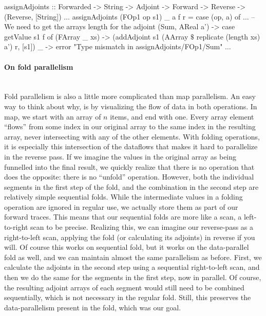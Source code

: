                 \begin{haskell}[caption=Implementation of the sum operator in \texttt{assignAdjoints}, label=lst:assign_sum, gobble=20]
                    assignAdjoints :: Forwarded -> String -> Adjoint -> Forward -> Reverse
                        -> (Reverse, [String])
                    $\dots$
                    assignAdjoints (FOp1 op s1) _ a f r = case (op, a) of
                        $\dots$
                                           -- We need to get the arrays length for the adjoint
                        (Sum, AReal a') -> case getValue s1 f of
                            (FArray _ xs) ->
                                (addAdjoint s1 (AArray $\$$ replicate (length xs) a') r, [s1])
                            _             -> error "Type mismatch in assignAdjoints/FOp1/Sum"
                    $\dots$
                \end{haskell}

            \paragraph{On fold parallelism}\mbox{}\\
                Fold parallelism is also a little more complicated than map parallelism.
                An easy way to think about why, is by visualizing the flow of data in both operations.
                In map, we start with an array of $n$ items, and end with one.
                Every array element ``flows'' from some index in our original array to the same index in the resulting array, never intersecting with any of the other elements.
                With folding operations, it is especially this intersection of the dataflows that makes it hard to parallelize in the reverse pass.
                If we imagine the values in the original array as being funnelled into the final result, we quickly realize that there is no operation that does the opposite: there is no ``unfold'' operation.
                However, both the individual segments in the first step of the fold, and the combination in the second step are relatively simple sequential folds.
                While the intermediate values in a folding operation are ignored in regular use, we actually store them as part of our forward traces.
                This means that our sequential folds are more like a scan, a left-to-right scan to be precise.
                Realizing this, we can imagine our reverse-pass as a right-to-left scan, applying the fold (or calculating its adjoints) in reverse if you will.
                Of course this works on sequential fold, but it works on the data-parallel fold as well, and we can maintain almost the same parallelism as before.
                First, we calculate the adjoints in the second step using a sequential right-to-left scan, and then we do the same for the segments in the first step, now in parallel.
                Of course, the resulting adjoint arrays of each segment would still need to be combined sequentially, which is not necessary in the regular fold.
                Still, this preserves the data-parallelism present in the fold, which was our goal.
            

